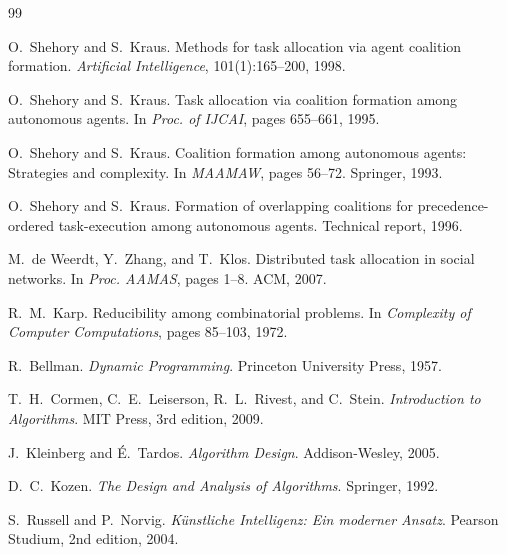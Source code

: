 ﻿\documentclass[a4paper,12pt]{article}
\theoremstyle{definition}
\begin{document}
\begin{thebibliography}{99}

O.\ Shehory and S.\ Kraus.
\newblock Methods for task allocation via agent coalition formation.
\newblock \textit{Artificial Intelligence}, 101(1):165--200, 1998.

O.\ Shehory and S.\ Kraus.
\newblock Task allocation via coalition formation among autonomous agents.
\newblock In \textit{Proc. of IJCAI}, pages 655--661, 1995.

O.\ Shehory and S.\ Kraus.
\newblock Coalition formation among autonomous agents: Strategies and complexity.
\newblock In \textit{MAAMAW}, pages 56--72. Springer, 1993.

O.\ Shehory and S.\ Kraus.
\newblock Formation of overlapping coalitions for precedence-ordered
         task-execution among autonomous agents.
\newblock Technical report, 1996.

M.\ de Weerdt, Y.\ Zhang, and T.\ Klos.
\newblock Distributed task allocation in social networks.
\newblock In \textit{Proc. AAMAS}, pages 1--8. ACM, 2007.

R.\ M.\ Karp.
\newblock Reducibility among combinatorial problems.
\newblock In \textit{Complexity of Computer Computations}, pages 85--103, 1972.

R.\ Bellman.
\newblock \textit{Dynamic Programming}.
\newblock Princeton University Press, 1957.

T.\ H.\ Cormen, C.\ E.\ Leiserson, R.\ L.\ Rivest, and C.\ Stein.
\newblock \textit{Introduction to Algorithms}.
\newblock MIT Press, 3rd edition, 2009.

J.\ Kleinberg and \'{E}.\ Tardos.
\newblock \textit{Algorithm Design}.
\newblock Addison-Wesley, 2005.

D.\ C.\ Kozen.
\newblock \textit{The Design and Analysis of Algorithms}.
\newblock Springer, 1992.

S.\ Russell and P.\ Norvig.
\newblock \textit{K\"{u}nstliche Intelligenz: Ein moderner Ansatz}.
\newblock Pearson Studium, 2nd edition, 2004.


\end{thebibliography}
\end{document}

